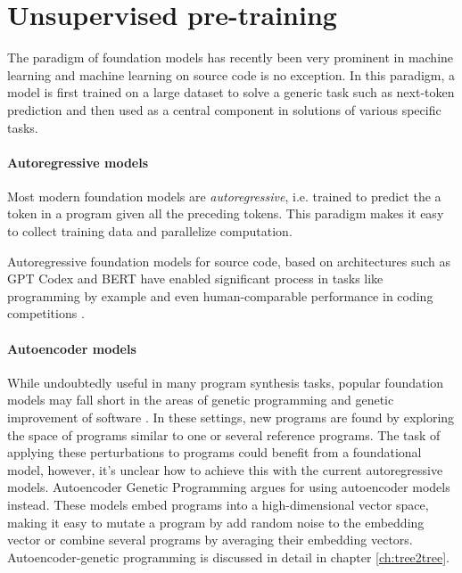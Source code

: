 \newpage
\section{Unsupervised pre-training}
\label{sec:pretrain}

The paradigm of foundation models \cite{foundation-models} has recently been very prominent in machine learning and machine learning on source code is no exception.
In this paradigm, a model is first trained on a large dataset to solve a generic task such as next-token prediction and then used as a central component in solutions of various specific tasks.


\paragraph{Autoregressive models}

Most modern foundation models are \emph{autoregressive}, i.e. trained to predict the a token in a program given all the preceding tokens.
This paradigm makes it easy to collect training data and parallelize computation.


Autoregressive foundation models for source code, based on architectures such as GPT Codex \cite{radfordImprovingLanguageUnderstanding,chenEvaluatingLargeLanguage2021,codegen,gpt-neo} and BERT \cite{devlinBERTPretrainingDeep2019,codebert} have enabled significant process in tasks like programming by example \cite{halbertProgrammingExample1984} and even human-comparable performance in coding competitions \cite{liCompetitionLevelCodeGeneration2022}.

\paragraph{Autoencoder models}

While undoubtedly useful in many program synthesis tasks, popular foundation models may fall short in the areas of genetic programming \cite{genprogast} and genetic improvement of software \cite{petke2018:genetic}.
In these settings, new programs are found by exploring the space of programs similar to one or several reference programs.
The task of applying these perturbations to programs could benefit from a foundational model, however, it's unclear how to achieve this with the current autoregressive models.
Autoencoder Genetic Programming \cite{autoenc-gp,denoising-autoenc-gp,latentspaceopt} argues for using autoencoder \cite{autoencoders} models instead.
These models embed programs into a high-dimensional vector space, making it easy to mutate a program by add random noise to the embedding vector or combine several programs by averaging their embedding vectors.
Autoencoder-genetic programming is discussed in detail in chapter \ref{ch:tree2tree}.

